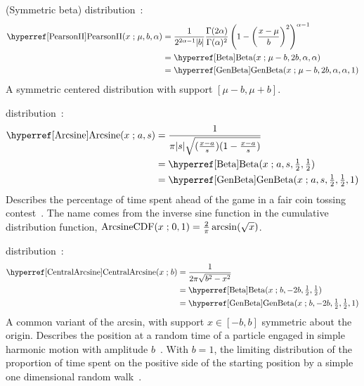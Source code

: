  (Symmetric beta) distribution~\cite{Pearson1895}: 
%
\begin{align}
\label{PearsonII}
\opr{PearsonII}(x\given \mu, b,\alpha) 
&= \frac{1}{2^{2\alpha-1}  |b|}\frac{\Gamma(2\alpha) }{ \Gamma(\alpha)^2 } \left(1-\left(\frac{x-\mu}{ b}\right)^2 \right)^{\alpha-1}
\checked
 \\
& = \opr{Beta}(x\given \mu-b, 2b,\alpha, \alpha) \notag  \\
\checked
& = \opr{GenBeta}(x\given \mu-b, 2 b ,\alpha, \alpha,1) \notag
\checked
\end{align}
A symmetric centered distribution with support $[\mu-b, \mu+b]$.



 distribution~\cite{Norton1975}:
\begin{align}
\label{Arcsine}
\opr{Arcsine}(x\given a, s) &= \frac{1}{\pi |s| \sqrt{(\tfrac{x-a}{s}) (1-\frac{x-a}{s} )}} \checked \\
& =\opr{Beta}(x\given a,s,   \tfrac{1}{2},  \tfrac{1}{2}) \notag \checked \\
& =\opr{GenBeta}(x\given a,s, \tfrac{1}{2}, \tfrac{1}{2},1) \notag \checked
\end{align}
Describes the percentage of time spent ahead of the game in a fair coin tossing contest~\cite{Johnson1995,Norton1975}. The name comes from the inverse sine function in the cumulative distribution function,
$
\operatorname{ArcsineCDF}(x\mathrel{;} 0,1) = \frac{2}{\pi} \operatorname{arcsin}( \sqrt{x}) 
$.



 
 distribution~\cite{Norton1975}: 
\begin{align}
\label{CentralArcsine}
\opr{CentralArcsine}(x\given b) &= \frac{1}{2 \pi  \sqrt{b^2-x^2}} \checked \\
& =\opr{Beta}(x\given b,-2b, \tfrac{1}{2}, \tfrac{1}{2})  \checked \notag \\
& =\opr{GenBeta}(x\given b,-2b, \tfrac{1}{2}, \tfrac{1}{2},1)  \checked \notag
\end{align}
A common variant of the arcsin, with support $x\in [-b,b]$ symmetric about the origin. Describes the position at a random time of a particle engaged in simple harmonic motion with amplitude $b$~\cite{Norton1975}. With $b=1$, the limiting distribution of the proportion of time spent on the positive side of the starting position by a simple one dimensional random walk~\cite{Feller1968}.


